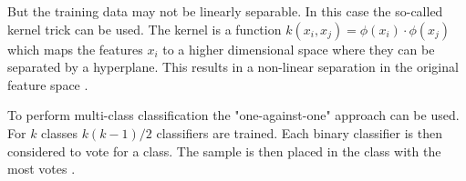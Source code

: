 But the training data may not be linearly separable. In this case the so-called kernel trick can be used. The kernel is a function \(k\left ( x_{i}, x_{j} \right )=\phi \left ( x_{i} \right )\cdot \phi\left ( x_{j} \right )\) which maps the features \(x_{i}\) to a higher dimensional space where they can be separated by a hyperplane. This results in a non-linear separation in the original feature space \cite{ErikKimKernelTrick}.

To perform multi-class classification the "one-against-one" approach can be used. For \(k\) classes \(k\left ( k-1 \right )/2\) classifiers are trained. Each binary classifier is then considered to vote for a class. The sample is then placed in the class with the most votes \cite{chang2011libsvm}.
